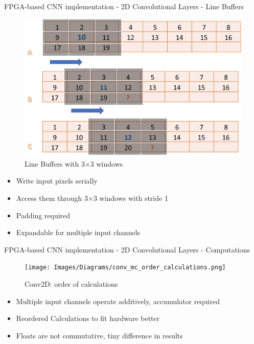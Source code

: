 \begin{frame}{FPGA-based CNN implementation - 2D Convolutional Layers - Line Buffers}
	\begin{minipage}{0.5\textwidth}
    	\begin{figure}[H]
            \centering
    		\includegraphics[width=1\textwidth]{Images/Diagrams/line_buf_conv.jpg}
            \caption*{Line Buffers with 3$\times$3 windows}
    	\end{figure}%
	\end{minipage}%
	\begin{minipage}{0.5\textwidth}
    	\begin{itemize}
    	    \item Write input pixels serially
    	    \item Access them through 3$\times$3 windows with stride 1
    	    \item Padding required
    	    \item Expandable for multiple input channels
    	\end{itemize}
	\end{minipage}%
\end{frame}

\begin{frame}{FPGA-based CNN implementation - 2D Convolutional Layers - Computations}
	\begin{minipage}{0.4\textwidth}
    	\begin{figure}[H]
            \centering
    		\texttt{[image: Images/Diagrams/conv\_mc\_order\_calculations.png]}
            \caption*{Conv2D: order of calculations}
    	\end{figure}%
	\end{minipage}%
	\begin{minipage}{0.6\textwidth}
    	\begin{itemize}
    	    \item Multiple input channels operate additively, accumulator required
    	    \item Reordered Calculations to fit hardware better
    	    \item Floats are not commutative, tiny difference in results
    	\end{itemize}
	\end{minipage}%
\end{frame}



